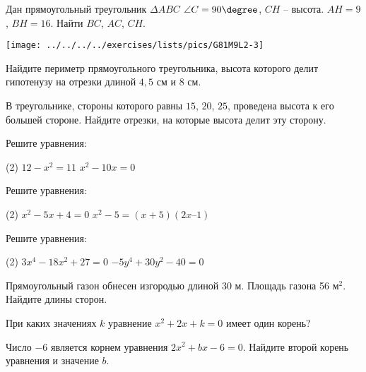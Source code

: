 \begin{class}[number=2]
\begin{listofex}
\begin{minipage}[t]{\bodywidth}
		 Дан прямоугольный треугольник  \( \Delta ABC\)  \( \angle C = 90\degree  \), \( CH \) – высота. \( AH=9 \), \( BH = 16 \). Найти \( BC \), \( AC \), \( CH \).
	\end{minipage}
	\hspace{0.02\linewidth}
	\begin{minipage}[t]{\picwidth}
		\texttt{[image: ../../../../exercises/lists/pics/G81M9L2-3]}
	\end{minipage}
	\item Найдите периметр прямоугольного треугольника, высота которого делит гипотенузу на отрезки длиной \( 4,5 \) см и \( 8 \) см.
	\item В треугольнике, стороны которого равны \( 15 \), \( 20 \), \( 25 \), проведена высота к его большей стороне. Найдите отрезки, на которые высота делит эту сторону.
	\end{listofex}
\end{class}

\begin{homework}[number=1]
	\begin{listofex}
		\item Решите уравнения: 
		\begin{tasks}(2)
			\task \( 12 - x^{2} =11 \)
			\task \( x^{2} - 10x =0 \)
		\end{tasks}
		\item Решите уравнения: 
		\begin{tasks}(2)
			\task \(  x^{2} - 5x+4=0 \)
			\task \(  x^{2} - 5 =(x+5)(2x – 1)\)
		\end{tasks}
		\item Решите уравнения: 
		\begin{tasks}(2)
			\task \(  3x^{4}-18x^{2}+27=0 \)
			\task \(  -5y^{4}+30y^{2}-40=0\)
		\end{tasks}
		\item Прямоугольный газон обнесен изгородью длиной 30 м. Площадь газона 56 м\( ^{2} \). Найдите длины сторон. 
		\item При каких значениях \( k \) уравнение \( x^{2} + 2x + k = 0 \)  имеет один  корень?
		\item Число \( -6 \) является корнем уравнения \( 2x^{2} + bx - 6 = 0 \). Найдите второй корень уравнения и значение \( b \).
	\end{listofex}
\end{homework}

